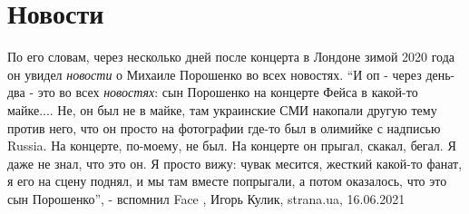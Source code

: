  
 
 
 
 
\chapter{Новости}

По его словам, через несколько дней после концерта в Лондоне зимой 2020 года он
увидел \emph{новости} о Михаиле Порошенко во всех новостях.  \enquote{И оп - через день-два -
это во всех \emph{новостях}: сын Порошенко на концерте Фейса в какой-то майке.... Не,
он был не в майке, там украинские СМИ накопали другую тему против него, что он
просто на фотографии где-то был в олимийке с надписью Russia. На концерте,
по-моему, не был. На концерте он прыгал, скакал, бегал. Я даже не знал, что это
он. Я просто вижу: чувак месится, жесткий какой-то фанат, я его на сцену
поднял, и мы там вместе попрыгали, а потом оказалось, что это сын Порошенко}, -
вспомнил Face
, 
Игорь Кулик, strana.ua, 16.06.2021

